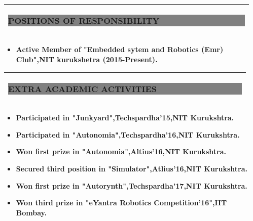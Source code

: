 \documentclass[12pt,a4paper,oneside]{letter}
\begin{document}
\begin{tabular}{|l|}
	\hline
	\colorbox{gray}{\begin{Large}
			
			\textbf{POSITIONS OF RESPONSIBILITY$\qquad$ $\qquad $  $\qquad $  $\qquad$ $\quad$   }
	\end{Large}   }  \\ \hline
\end{tabular}
\begin{itemize}
	\item \textbf{Active Member of "Embedded sytem and Robotics (Emr) Club",NIT kurukshetra (2015-Present).}
\end{itemize} 



\begin{tabular}{|l|}
	
	\hline
	\colorbox{gray}{\begin{Large}
			
			\textbf{EXTRA ACADEMIC ACTIVITIES$\qquad$ $\qquad $  $\qquad $  $\qquad$ $\quad$   }
	\end{Large}   }  \\ \hline
\end{tabular}
\begin{itemize}
	\item \textbf{Participated in "Junkyard",Techspardha'15,NIT Kurukshtra.}
	\item \textbf{Participated in "Autonomia",Techspardha'16,NIT Kurukshtra.}
	\item \textbf{Won first prize in "Autonomia",Altius'16,NIT Kurukshtra.}
	\item \textbf{Secured third position in "Simulator",Atlius'16,NIT Kurukshtra.}
	\item \textbf{Won first prize in "Autorynth",Techspardha'17,NIT Kurukshtra.}
	\item \textbf{Won third prize in "eYantra Robotics Competition'16",IIT Bombay.}
\end{itemize}
	
\end{document}
